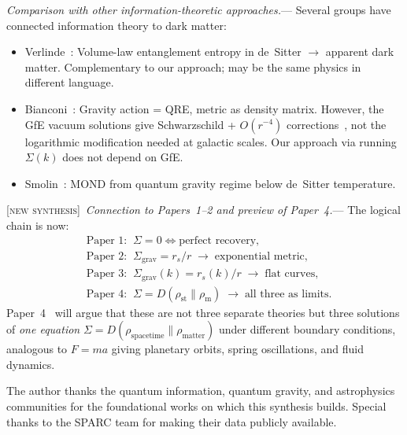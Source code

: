 \documentclass[prl,twocolumn,superscriptaddress,longbibliography,floatfix]{revtex4-2}
\newcommand{\newsyn}{\textsc{[new synthesis]}}
\begin{document}
\emph{Comparison with other information-theoretic approaches.}---
Several groups have connected information theory to dark matter:
\begin{itemize}
\item Verlinde~\cite{Verlinde2016}: Volume-law entanglement entropy
  in de~Sitter $\to$ apparent dark matter. Complementary to our
  approach; may be the same physics in different language.
\item Bianconi~\cite{Bianconi2025}: Gravity action = QRE,
  metric as density matrix. However, the GfE vacuum solutions
  give Schwarzschild + $O(r^{-4})$ corrections~\cite{Thattarampilly2026},
  not the logarithmic modification needed at galactic scales.
  Our approach via running $\Sigma(k)$ does not depend on GfE.
\item Smolin~\cite{Smolin2017}: MOND from quantum gravity regime
  below de~Sitter temperature.
\end{itemize}

\newsyn\ \emph{Connection to Papers~1--2 and preview of Paper~4.}---
The logical chain is now:
\begin{align}
&\text{Paper 1:}\;\; \Sigma = 0 \Leftrightarrow \text{perfect recovery},
  \nonumber\\
&\text{Paper 2:}\;\; \Sigma_{\mathrm{grav}} = r_s/r
  \;\to\; \text{exponential metric},
  \nonumber\\
&\text{Paper 3:}\;\; \Sigma_{\mathrm{grav}}(k) = r_s(k)/r
  \;\to\; \text{flat curves},
  \nonumber\\
&\text{Paper 4:}\;\; \Sigma = D(\rho_{\mathrm{st}} \| \rho_{\mathrm{m}})
  \;\to\; \text{all three as limits}.
  \nonumber
\end{align}
Paper~4~\cite{Paper4} will argue that these are not three
separate theories but three solutions of \emph{one equation}
$\Sigma = D(\rho_{\mathrm{spacetime}} \| \rho_{\mathrm{matter}})$
under different boundary conditions, analogous to $F = ma$ giving
planetary orbits, spring oscillations, and fluid dynamics.

\begin{acknowledgments}
The author thanks the quantum information, quantum gravity,
and astrophysics communities for the foundational works on
which this synthesis builds. Special thanks to the SPARC team
for making their data publicly available.
\end{acknowledgments}

\end{document}
